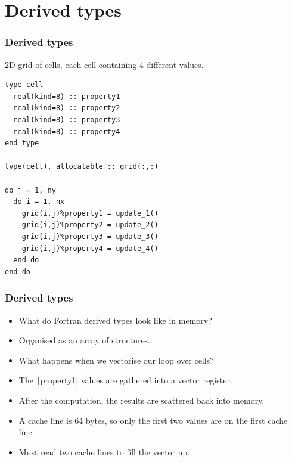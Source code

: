 \documentclass{beamer}
\begin{document}
\section{Derived types}
\begin{frame}[fragile]
\frametitle{Derived types}
2D grid of cells, each cell containing 4 different values.
\begin{verbatim}
type cell
  real(kind=8) :: property1
  real(kind=8) :: property2
  real(kind=8) :: property3
  real(kind=8) :: property4
end type

type(cell), allocatable :: grid(:,:)

do j = 1, ny
  do i = 1, nx
    grid(i,j)%property1 = update_1()
    grid(i,j)%property2 = update_2()
    grid(i,j)%property3 = update_3()
    grid(i,j)%property4 = update_4()
  end do
end do
\end{verbatim}
\end{frame}

\begin{frame}
\frametitle{Derived types}
\begin{itemize}
  \item What do Fortran derived types look like in memory?
  \item Organised as an array of structures.
  \item<2-> What happens when we vectorise our loop over cells?
\end{itemize}

\begin{adjustbox}{max width={\textwidth}}
\end{adjustbox}

\begin{itemize}
  \item<4-> The \texttt|property1| values are gathered into a vector register.
  \item<5-> After the computation, the results are scattered back into memory.
  \item<6-> A cache line is 64 bytes, so only the first two values are on the first cache line.
  \item<6-> Must read two cache lines to fill the vector up.
\end{itemize}
\end{frame}
\end{document}
